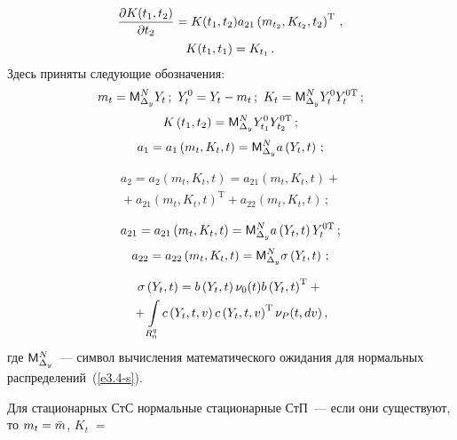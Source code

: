 \begin{multicols}{2}
\begin{itemize}
\vspace*{-12pt}
\begin{multline}
   \displaystyle\frac{\displaystyle \partial K(t_1, t_2)\mathstrut}{\displaystyle \partial t_2 \mathstrut}= K(t_1, t_2) a_{21} \left(m_{t_2}, K_{t_2}, t_2\right)^{\mathrm{T}}\,,\\
K(t_1, t_1) = K_{t_1}\,.
    \label{e3.7-s}
   \end{multline}
    Здесь приняты следующие обозначения:
    $$
    m_t = {\sf M}_{\Delta_y}^N Y_t\,;\  Y_t^0 = Y_t - m_t\,;\  K_t = {\sf M}_{\Delta_y}^N Y_t^0 Y_t^{0\mathrm{T}}\,;
    $$
    $$
    K\left(t_1, t_2\right) = {\sf M}_{\Delta_y}^N Y_{t_1}^{0} Y_{t_2}^{0\mathrm{T}}\,;
    $$
    $$
    a_1 = a_1 \left(m_t, K_t, t\right) = {\sf M}_{\Delta_y}^N a \left(Y_t, t\right)\,;
    $$

    \vspace*{-12pt}

    \noindent
    \begin{multline*}
    a_2 = a_2 \left(m_t, K_t, t\right) = a_{21} \left(m_t, K_t, t\right)+ {}\\
    {}+a_{21} \left(m_t, K_t, t\right)^{\mathrm{T}} +a_{22}\left(m_t, K_t, t\right)\,;
    \end{multline*}

    \vspace*{-9pt}

    \noindent
    $$
    a_{21} = a_{21}\left(m_t, K_t, t\right)=  {\sf M}_{\Delta_y}^N a\left(Y_t, t\right) Y_{t}^{0\mathrm{T}}\,;
    $$
    $$
    a_{22} = a_{22}\left(m_t, K_t, t\right)= {\sf M}_{\Delta_y}^N \sigma \left(Y_t, t\right)\,;
    $$

    \vspace*{-12pt}

    \noindent
    \begin{multline*}
    \si \left(Y_t, t\right) = b\left(Y_t, t\right) \nu_0(t) b\left(Y_t, t\right)^{\mathrm{T}} +{}\\
    {}+\iii_{R_0^q}
    c \left(Y_t, t, v\right) c\left(Y_t, t,v\right)^{\mathrm{T}} \nu_P (t, dv)\,, %
    \end{multline*}
где ${\sf M}_{\Delta_y}^N$~--- символ вычисления математического ожидания для нормальных распределений~(\ref{e3.4-s}).
    \end{itemize}

Для стационарных СтС нормальные стационарные СтП~--- если они
существуют, то  $m_t \hm=\bar m$, $ K_t\;=$\linebreak\vspace*{-12pt}


\end{multicols}
